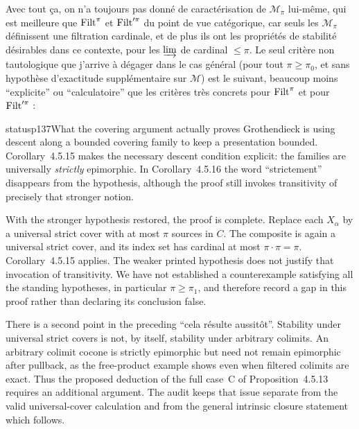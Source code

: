 Avec tout ça, on n'a toujours pas donné de caractérisation de $\mathcal{M}_{\pi}$ lui-même, qui est meilleure que $\operatorname{Filt}^{\pi}$ et $\operatorname{Filt}'^{\pi}$ du point de vue catégorique, car seuls les $\mathcal{M}_{\pi}$ définissent une filtration cardinale, et de plus ils ont les propriétés de stabilité désirables dans ce
contexte, pour les $\varinjlim$ de cardinal $\leqslant \pi$. Le seul critère non tautologique que j'arrive à dégager dans le cas général (pour tout $\pi \geqslant \pi_0$, et sans hypothèse d'exactitude supplémentaire sur $\mathcal{M}$) est le suivant, beaucoup moins ``explicite'' ou ``calculatoire'' que les critères très concrets pour $\operatorname{Filt}^{\pi}$ et pour $\operatorname{Filt}'^{\pi}$ :

\begin{dcomment}{status}{p137}{What the covering argument actually proves}
Grothendieck is using descent along a bounded covering family to keep a presentation bounded. Corollary~4.5.15 makes the necessary descent condition explicit: the families are universally \emph{strictly} epimorphic. In Corollary~4.5.16 the word ``strictement'' disappears from the hypothesis, although the proof still invokes transitivity of precisely that stronger notion.

With the stronger hypothesis restored, the proof is complete. Replace each $X_\alpha$ by a universal strict cover with at most $\pi$ sources in $C$. The composite is again a universal strict cover, and its index set has cardinal at most $\pi\cdot\pi=\pi$. Corollary~4.5.15 applies. The weaker printed hypothesis does not justify that invocation of transitivity. We have not established a counterexample satisfying all the standing hypotheses, in particular $\pi\geq\pi_1$, and therefore record a gap in this proof rather than declaring its conclusion false.

There is a second point in the preceding ``cela r\'esulte aussit\^ot''. Stability under universal strict covers is not, by itself, stability under arbitrary colimits. An arbitrary colimit cocone is strictly epimorphic but need not remain epimorphic after pullback, as the free-product example shows even when filtered colimits are exact. Thus the proposed deduction of the full case~C of Proposition~4.5.13 requires an additional argument. The audit keeps that issue separate from the valid universal-cover calculation and from the general intrinsic closure statement which follows.
\end{dcomment}


